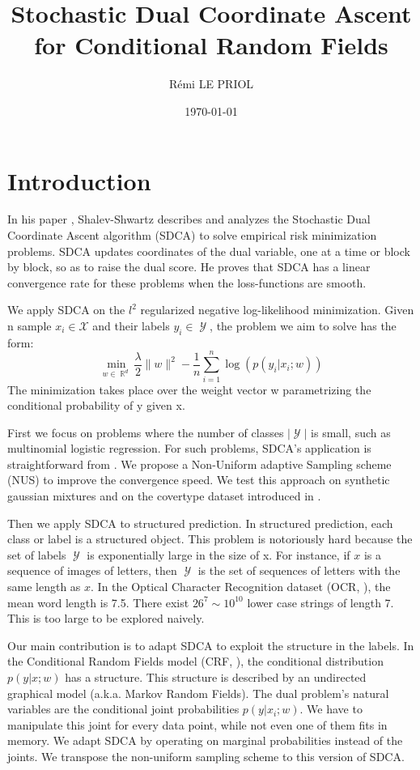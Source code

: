 \documentclass{article}
\title{Stochastic Dual Coordinate Ascent \\ for Conditional Random Fields}
\author{R\'emi LE PRIOL}
\affil{Montreal Institute of Learning Algorithms}
\date{\today}
\DeclareMathOperator{\R}{\mathbb{R}}
\DeclareMathOperator{\1}{\mathbb{1}}
\DeclareMathOperator{\Y}{\mathcal{Y}}
\begin{document}
\maketitle

\section*{Introduction}
In his paper \cite{shalev-shwartz_accelerated_2013-1}, Shalev-Shwartz describes and analyzes the Stochastic Dual Coordinate Ascent algorithm (SDCA) to solve empirical risk minimization problems.
SDCA updates coordinates of the dual variable, one at a time or block by block, so as to raise the dual score.
He proves that SDCA has a linear convergence rate for these problems when the loss-functions are smooth.

We apply SDCA on the $l^2$ regularized negative log-likelihood minimization.
Given n sample $x_i \in \mathcal X$ and their labels $y_i \in \Y$, the problem we aim to solve has the form:
\begin{equation}
	\label{max likelihood}
	 \min_{w \in \R^d} \frac{\lambda}{2}\|w\|^2 - \frac{1}{n}   \sum_{i=1}^{n} \log(p(y_i|x_i; w))
\end{equation}
The minimization takes place over the weight vector w parametrizing the conditional probability of y given x. 
  
First we focus on problems where the number of classes $|\Y|$ is small, such as multinomial logistic regression.
For such problems, SDCA's application is straightforward from \cite{shalev-shwartz_accelerated_2013-1}.
We propose a Non-Uniform adaptive Sampling scheme (NUS) to improve the convergence speed.
We test this approach on synthetic gaussian mixtures and on the covertype dataset introduced in \cite{blackard_comparative_1999}.
 
Then we apply SDCA to structured prediction.
In structured prediction, each class or label is a structured object.
This problem is notoriously hard because the set of labels $\Y$ is exponentially large in the size of x.
For instance, if $x$ is a sequence of images of letters, then $\Y$ is the set of sequences of  letters with the same length as $x$.
In the Optical Character Recognition dataset (OCR, \cite{taskar_max-margin_2004}), the mean word length is 7.5.
There exist $26^7 \sim 10^{10}$ lower case strings of length 7.
This is too large to be explored naively.

Our main contribution is to adapt SDCA to exploit the structure in the labels.
In the Conditional Random Fields model (CRF, \cite{lafferty_conditional_2001} ), the conditional distribution $p(y|x ; w)$ has a structure.
This structure is described by an undirected graphical model (a.k.a. Markov Random Fields). 
The dual problem's natural variables are the conditional joint probabilities $p(y|x_i ; w)$.
We have to manipulate this joint for every data point, while not even one of them fits in memory.
We adapt SDCA by operating on marginal probabilities instead of the joints.
We transpose the non-uniform sampling scheme to this version of SDCA.
\end{document}
